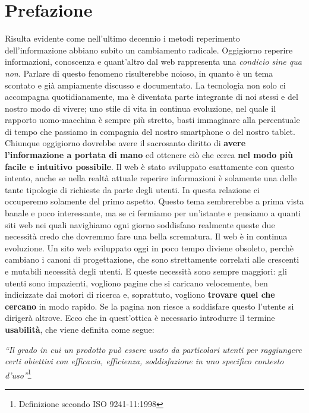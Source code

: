 \section*{Prefazione}

Risulta evidente come nell'ultimo decennio i metodi reperimento dell'informazione abbiano subito un cambiamento radicale. Oggigiorno reperire informazioni, conoscenza e quant'altro dal web rappresenta una \textit{condicio sine qua non}. Parlare di questo fenomeno risulterebbe noioso, in quanto è un tema scontato e già ampiamente discusso e documentato. La tecnologia non solo ci accompagna quotidianamente, ma è diventata parte integrante di noi stessi e del nostro modo di vivere; uno stile di vita in continua evoluzione, nel quale il rapporto uomo-macchina è sempre più stretto, basti immaginare alla percentuale di tempo che passiamo in compagnia del nostro smartphone o del nostro tablet.
\linebreak
\linebreak
Chiunque oggigiorno dovrebbe avere il sacrosanto diritto di \textbf{avere l'informazione a portata di mano} ed ottenere ciò che cerca \textbf{nel modo più facile e intuitivo possibile}. Il web è stato sviluppato esattamente con questo intento, anche se nella realtà attuale reperire informazioni è solamente una delle tante tipologie di richieste da parte degli utenti. In questa relazione ci occuperemo solamente del primo aspetto. Questo tema sembrerebbe a prima vista banale e poco interessante, ma se ci fermiamo per un'istante e pensiamo a quanti siti web nei quali navighiamo ogni giorno soddisfano realmente queste due necessità credo che dovremmo fare una bella scrematura.
\linebreak
\linebreak
Il web è in continua evoluzione. Un sito web sviluppato oggi in poco tempo diviene obsoleto, perchè cambiano i canoni di progettazione, che sono strettamente correlati alle crescenti e mutabili necessità degli utenti. E queste necessità sono sempre maggiori: gli utenti sono impazienti, vogliono pagine che si caricano velocemente, ben indicizzate dai motori di ricerca e, soprattuto, vogliono \textbf{trovare quel che cercano} in modo rapido. Se la pagina non riesce a soddisfare questo l'utente si dirigerà altrove. Ecco che in quest'ottica è necessario introdurre il termine \textbf{usabilità}, che viene definita come segue:

\begin{center}

\textit{``Il grado in cui un prodotto può essere usato da particolari utenti per raggiungere certi obiettivi con efficacia, efficienza, soddisfazione in uno specifico contesto d’uso''}\footnote{Definizione secondo ISO 9241-11:1998}

\end{center}

